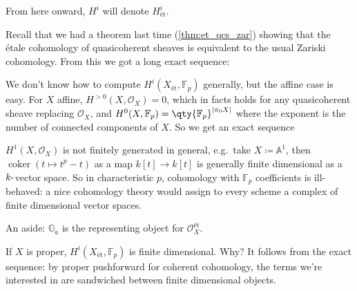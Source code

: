 \begin{remark}

From here onward, \(H^i\) will denote \(H^i_\text{ét}\).

\end{remark}

Recall that we had a theorem last time (\cref{thm:et_qcs_zar}) showing
that the étale cohomology of quasicoherent sheaves is equivalent to the
usual Zariski cohomology. From this we got a long exact sequence:

We don't know how to compute \(H^i(X_\text{ét}, {\mathbb{F}}_p)\)
generally, but the affine case is easy. For \(X\) affine,
\(H^{>0}(X, {\mathcal{O}}_X) = 0\), which in facts holds for any
quasicoherent sheave replacing \({\mathcal{O}}_X\), and
\(H^0(X, {\mathbb{F}}_p) = \qty{{\mathbb{F}}_p}^{{\left\lvert {\pi_0 X} \right\rvert} }\)
where the exponent is the number of connected components of \(X\). So we
get an exact sequence

\begin{remark}

\(H^1(X, {\mathcal{O}}_X)\) is not finitely generated in general,
e.g.~take \(X \coloneqq{\mathbb{A}}^1\), then
\(\operatorname{coker}(t\mapsto t^p - t)\) as a map \(k[t] \to k[t]\) is
generally finite dimensional as a \(k{\hbox{-}}\)vector space. So in
characteristic \(p\), cohomology with \({\mathbb{F}}_p\) coefficients is
ill-behaved: a nice cohomology theory would assign to every scheme a
complex of finite dimensional vector spaces.

\end{remark}

\begin{remark}

An aside: \({\mathbb{G}}_a\) is the representing object for
\({\mathcal{O}}_X^\text{ét}\).

\end{remark}

\begin{remark}

If \(X\) is proper, \(H^i(X_\text{ét}, {\mathbb{F}}_p)\) is finite
dimensional. Why? It follows from the exact sequence: by proper
pushforward for coherent cohomology, the terms we're interested in are
sandwiched between finite dimensional objects.

\end{remark}

